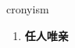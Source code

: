 
\begin{frame}
{\huge cronyism}
\begin{center}
\begin{enumerate}\Large
  \item \textbf{任人唯亲}
\end{enumerate}
\end{center}
\end{frame}

